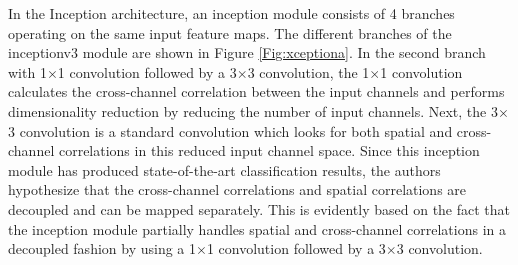 In the Inception architecture, an inception module consists of 4 branches operating on the same input feature maps. The different branches of the inceptionv3 module are shown in Figure \ref{Fig:xceptiona}. In the second branch with 1$\times$1 convolution followed by a 3$\times$3 convolution, the 1$\times$1 convolution calculates the cross-channel correlation between the input channels and performs dimensionality reduction by reducing the number of input channels. Next, the 3$\times$3 convolution is a standard convolution which looks for both spatial and cross-channel correlations in this reduced input channel space. Since this inception module has produced state-of-the-art classification results, the authors hypothesize that the cross-channel correlations and spatial correlations are decoupled and can be mapped separately. This is evidently based on the fact that the inception module partially handles spatial and cross-channel correlations in a decoupled fashion by using a 1$\times$1 convolution followed by a 3$\times$3 convolution. 

